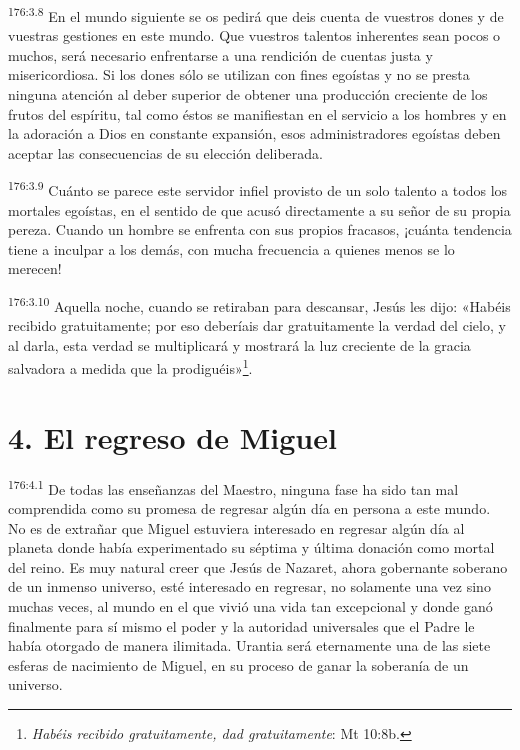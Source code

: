 \par
\textsuperscript{176:3.8} En el mundo siguiente se os pedirá que deis cuenta de vuestros dones y de vuestras gestiones en este mundo. Que vuestros talentos inherentes sean pocos o muchos, será necesario enfrentarse a una rendición de cuentas justa y misericordiosa. Si los dones sólo se utilizan con fines egoístas y no se presta ninguna atención al deber superior de obtener una producción creciente de los frutos del espíritu, tal como éstos se manifiestan en el servicio a los hombres y en la adoración a Dios en constante expansión, esos administradores egoístas deben aceptar las consecuencias de su elección deliberada.

\par
\textsuperscript{176:3.9} Cuánto se parece este servidor infiel provisto de un solo talento a todos los mortales egoístas, en el sentido de que acusó directamente a su señor de su propia pereza. Cuando un hombre se enfrenta con sus propios fracasos, ¡cuánta tendencia tiene a inculpar a los demás, con mucha frecuencia a quienes menos se lo merecen!

\par
\textsuperscript{176:3.10} Aquella noche, cuando se retiraban para descansar, Jesús les dijo: «Habéis recibido gratuitamente; por eso deberíais dar gratuitamente la verdad del cielo, y al darla, esta verdad se multiplicará y mostrará la luz creciente de la gracia salvadora a medida que la prodiguéis»\footnote{\textit{Habéis recibido gratuitamente, dad gratuitamente}: Mt 10:8b.}.

\section*{4. El regreso de Miguel}
\par
\textsuperscript{176:4.1} De todas las enseñanzas del Maestro, ninguna fase ha sido tan mal comprendida como su promesa de regresar algún día en persona a este mundo. No es de extrañar que Miguel estuviera interesado en regresar algún día al planeta donde había experimentado su séptima y última donación como mortal del reino. Es muy natural creer que Jesús de Nazaret, ahora gobernante soberano de un inmenso universo, esté interesado en regresar, no solamente una vez sino muchas veces, al mundo en el que vivió una vida tan excepcional y donde ganó finalmente para sí mismo el poder y la autoridad universales que el Padre le había otorgado de manera ilimitada. Urantia será eternamente una de las siete esferas de nacimiento de Miguel, en su proceso de ganar la soberanía de un universo.

